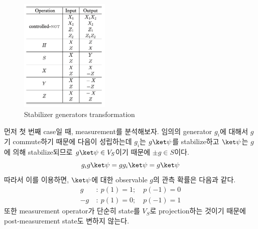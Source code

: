 \begin{figure}[h]
    \centering
    \includegraphics[width=0.38\textwidth]{figures/stabilizer.png}
    \caption{Stabilizer generators transformation}
    \label{fig:transformation}
\end{figure}

먼저 첫 번째 case일 때, measurement를 분석해보자. 임의의 generator $g_i$에 대해서 $g$기 commute하기 때문에 다음이 성립하는데 $g_i$는 $g \ket \psi$를 stabilize하고 $\ket \psi$는 $g$에 의해 stabilize되므로 $g \ket \psi \in V_S$이기 때문에 $\pm g \in S$이다. 
\begin{equation*}
    g_i g \ket \psi = g g_i \ket \psi = g \ket \psi
\end{equation*}
따라서 이를 이용하면, $\ket \psi$에 대한 observable $g$의 관측 확률은 다음과 같다. 
\begin{align*}
    g \ &: \ p(1)=1 ; \quad p(-1)=0 \\
    -g \ &: \ p(1) = 0 ; \quad p(-1) = 1
\end{align*}
또한 measurement operator가 단순히 state를 $V_S$로 projection하는 것이기 때문에 post-measurement state도 변하지 않는다.

